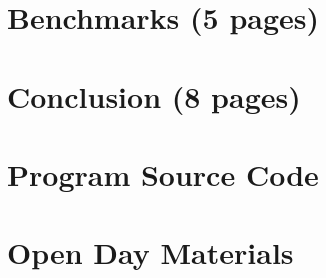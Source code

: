 \documentclass[twoside,a4paper,12pt]{report}
\begin{document}
\chapter{Benchmarks (5 pages)}

\lipsum[21-30]

\chapter{Conclusion (8 pages)}

\lipsum[31-40]


%
%

\appendix

\chapter{Program Source Code}


\chapter{Open Day Materials}



%
%


\end{document}
